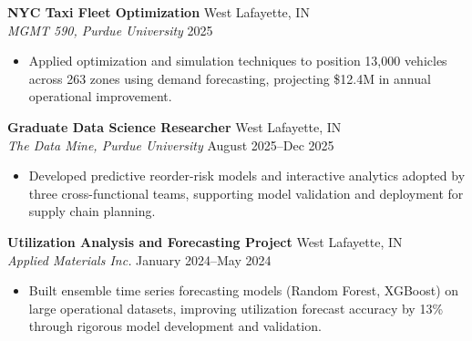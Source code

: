 \documentclass[11pt,a4paper]{article}
\begin{document}
\noindent
\textbf{NYC Taxi Fleet Optimization} \hfill West Lafayette, IN \\
\textit{MGMT 590, Purdue University} \hfill 2025
\begin{itemize}[leftmargin=*, noitemsep, topsep=0pt]
    \item Applied optimization and simulation techniques to position 13,000 vehicles across 263 zones using demand forecasting, projecting \$12.4M in annual operational improvement.
\end{itemize}
\vspace{6pt}

\noindent
\textbf{Graduate Data Science Researcher} \hfill West Lafayette, IN \\
\textit{The Data Mine, Purdue University} \hfill August 2025--Dec 2025
\begin{itemize}[leftmargin=*, noitemsep, topsep=0pt]
    \item Developed predictive reorder-risk models and interactive analytics adopted by three cross-functional teams, supporting model validation and deployment for supply chain planning.
\end{itemize}
\vspace{6pt}

\noindent
\textbf{Utilization Analysis and Forecasting Project} \hfill West Lafayette, IN \\
\textit{Applied Materials Inc.} \hfill January 2024--May 2024
\begin{itemize}[leftmargin=*, noitemsep, topsep=0pt]
    \item Built ensemble time series forecasting models (Random Forest, XGBoost) on large operational datasets, improving utilization forecast accuracy by 13\% through rigorous model development and validation.
\end{itemize}
\end{document}
